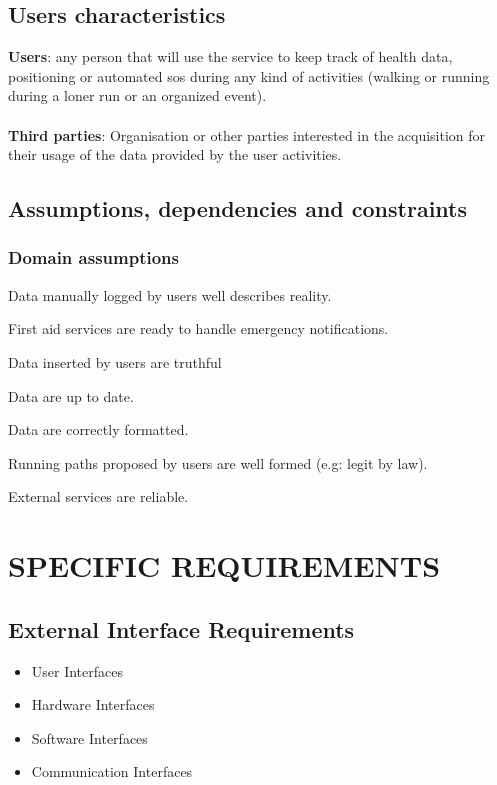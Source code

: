 \documentclass{article}
\begin{document}
\subsection{Users characteristics}
\textbf{Users}: any person that will use the service to keep track of health data, positioning or automated sos during any kind of activities (walking or running during a loner run or an organized event).\\\\
\textbf{Third parties}: Organisation or other parties interested in the acquisition for their usage of the data provided by the user activities.

\subsection{Assumptions, dependencies and constraints}

\subsubsection{Domain assumptions}

\begin{enumerate}[label={[D\arabic*]}]
    	\item Data manually logged by users well describes reality.
    	\item First aid services are ready to handle emergency notifications.
    	\item Data inserted by users are truthful 
    		\begin{enumerate}[label={[D\arabic{enumi}.\arabic*]}]
    			\item Data are up to date.
    			\item Data are correctly formatted.
  			\end{enumerate}
  		
  		\item Running paths proposed by users are well formed (e.g: legit by law).
  		\item External services are reliable.
\end{enumerate}

\section{SPECIFIC REQUIREMENTS}
\subsection{External Interface Requirements}
		\begin{itemize}
			\item User Interfaces
			\item Hardware Interfaces
			\item Software Interfaces
			\item Communication Interfaces
		\end{itemize}
\end{document}
